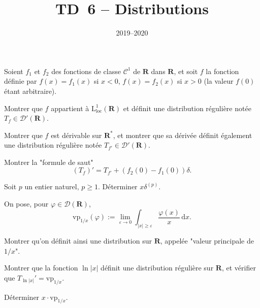 \documentclass[11pt,a4paper]{article}
\title{TD~6 -- Distributions}
\date{2019--2020}
\def\R{\mathbf{R}}
\def\L{\mathrm{L}}
\def\CC{\mathscr{C}}
\def\DD{\mathscr{D}}
\def\vp{\mathrm{vp}}
\def\d{\mathrm{d}}
\def\veps{\varepsilon}
\def\vphi{\varphi}
\begin{document}
\maketitle

\begin{Exercice} Soient $f_1$ et $f_2$ des fonctions de classe $\CC^1$ de $\R$ dans
$\R$, et soit $f$ la fonction d\'efinie par $f(x)=f_1(x)$ si $x<0$, $f(x)=f_2(x)$ si
$x>0$ (la valeur $f(0)$ \'etant arbitraire).

\begin{Question} Montrer que $f$ appartient \`a $\L^1_\mathrm{loc}(\R)$ et
d\'efinit une distribution r\'eguli\`ere not\'ee $T_f \in \DD'(\R)$.
\end{Question}

\begin{Question} Montrer que $f$ est d\'erivable sur $\R^*$, et montrer que sa
d\'eriv\'ee d\'efinit \'egalement une distribution r\'eguli\`ere not\'ee
$T_{f'} \in \DD'(\R)$. 
\end{Question}

\begin{Question} Montrer la "formule de saut"
\[ (T_f)' = T_{f'}+(f_2(0)-f_1(0))\delta. \]
\end{Question}

\end{Exercice} \vspace*{1em}

\begin{Exercice} Soit $p$ un entier naturel, $p \geq 1$. D\'eterminer $x\delta^{(p)}$. 
\end{Exercice} \vspace*{1em}

\begin{Exercice} On pose, pour $\vphi \in \DD(\R)$, 
\[ \vp_{1/x}(\vphi) :=
   \lim_{\veps \to 0} \int_{|x| \geq \veps} \frac{\vphi(x)}{x}\,\d x. \]

\begin{Question} Montrer qu'on d\'efinit ainsi une distribution sur $\R$, appel\'ee
"valeur principale de $1/x$".
\end{Question}

\begin{Question} Montrer que la fonction $\ln|x|$ d\'efinit une
distribution r\'eguli\`ere sur $\R$, et v\'erifier que $T_{\ln|x|}'=\vp_{1/x}$.
\end{Question}

\begin{Question} D\'eterminer $x\cdot\vp_{1/x}$.
\end{Question}

\end{Exercice} \vspace*{1em}
\end{document}
